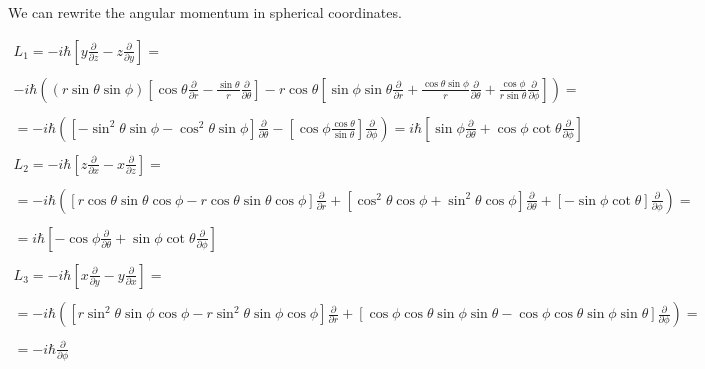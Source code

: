 We can rewrite the angular momentum in spherical coordinates.

\begin{equation}
  \begin{array}{c}
    L_1 = -i\hbar\left[y\frac{\partial}{\partial z}-z\frac{\partial}{\partial y}\right] =
    \\

    \\
    -i\hbar\left((r\sin{\theta}\sin{\phi})\left[\cos{\theta}\frac{\partial}{\partial r} - \frac{\sin{\theta}}{r} \frac{\partial}{\partial \theta}\right]-r\cos{\theta}\left[\sin{\phi}\sin{\theta}\frac{\partial}{\partial r} + \frac{\cos{\theta}\sin{\phi}}{r} \frac{\partial}{\partial \theta} + \frac{\cos{\phi}}{r\sin{\theta}} \frac{\partial}{\partial \phi}\right]\right) =
    \\

    \\
    = -i\hbar\left(\left[-\sin^2\theta\sin\phi-\cos^2\theta\sin\phi\right]\frac{\partial}{\partial \theta}-\left[\cos\phi\frac{\cos\theta}{\sin\theta}\right]\frac{\partial}{\partial\phi}\right) = i\hbar\left[\sin\phi\frac{\partial}{\partial\theta}+\cos\phi\cot\theta\frac{\partial}{\partial\phi}\right]
    \\

    \\
    L_2 = -i\hbar\left[z\frac{\partial}{\partial x}-x\frac{\partial}{\partial z}\right] =
    \\

    \\
    = -i\hbar\left(\left[r\cos\theta\sin\theta\cos\phi-r\cos\theta\sin\theta\cos\phi\right]\frac{\partial}{\partial r} + \left[\cos^2\theta\cos\phi+\sin^2\theta\cos\phi\right]\frac{\partial}{\partial \theta}+\left[-\sin\phi\cot\theta\right]\frac{\partial}{\partial\phi}\right) =
    \\

    \\
    = i\hbar\left[-\cos\phi\frac{\partial}{\partial\theta}+\sin\phi\cot\theta\frac{\partial}{\partial\phi}\right]
    \\

    \\
    L_3 = -i\hbar\left[x\frac{\partial}{\partial y}-y\frac{\partial}{\partial x}\right] =
    \\

    \\
    = -i\hbar\left(\left[r\sin^2\theta\sin\phi\cos\phi-r\sin^2\theta\sin\phi\cos\phi\right]\frac{\partial}{\partial r} + \left[\cos\phi\cos\theta\sin\phi\sin\theta-\cos\phi\cos\theta\sin\phi\sin\theta\right]\frac{\partial}{\partial\phi}\right) =
    \\

    \\
    = -i\hbar\frac{\partial}{\partial \phi}
  \end{array}
\end{equation}

